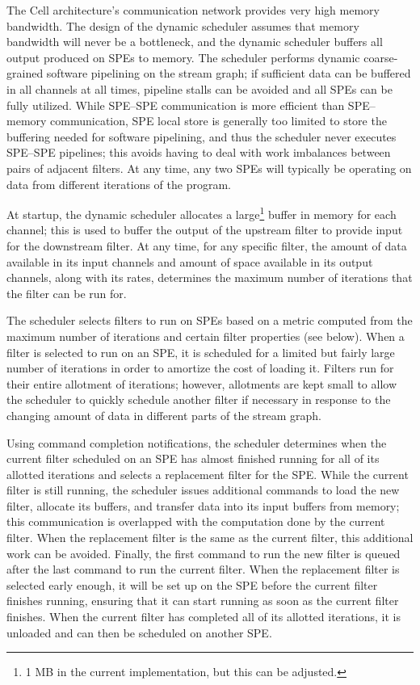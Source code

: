 The Cell architecture's communication network provides very high
memory bandwidth. The design of the dynamic scheduler assumes that
memory bandwidth will never be a bottleneck, and the dynamic scheduler
buffers all output produced on SPEs to memory. The scheduler performs
dynamic coarse-grained software pipelining on the stream graph; if
sufficient data can be buffered in all channels at all times, pipeline
stalls can be avoided and all SPEs can be fully utilized. While
SPE--SPE communication is more efficient than SPE--memory
communication, SPE local store is generally too limited to store the
buffering needed for software pipelining, and thus the scheduler never
executes SPE--SPE pipelines; this avoids having to deal with work
imbalances between pairs of adjacent filters. At any time, any two
SPEs will typically be operating on data from different 
iterations of the program.

At startup, the dynamic scheduler allocates a large\footnote{1 MB in
the current implementation, but this can be adjusted.} buffer in
memory for each channel; this is used to buffer the output of the
upstream filter to provide input for the downstream filter. At any
time, for any specific filter, the amount of data available in its
input channels and amount of space available in its output channels,
along with its rates, determines the maximum number of iterations that
the filter can be run for.

The scheduler selects filters to run on SPEs based on a metric
computed from the maximum number of iterations and certain filter
properties (see below). When a filter is selected to run on an SPE, it
is scheduled for a limited but fairly large number of iterations in
order to amortize the cost of loading it. Filters run for their entire
allotment of iterations; however, allotments are kept small to allow
the scheduler to quickly schedule another filter if necessary in
response to the changing amount of data in different parts of the stream graph.

Using command completion notifications,
the scheduler determines when the current filter scheduled on an SPE has
almost finished running for all of its allotted iterations and selects
a replacement filter for the SPE.
While the current filter is still running, the
scheduler issues additional commands to load the new filter, allocate
its buffers, and transfer data into its input buffers from memory;
this communication is overlapped with the computation done by the
current filter. When the replacement filter is the same as the current
filter, this additional work can be avoided. Finally, the first
command to run the new filter is queued after the last command to run
the current filter. When the replacement filter is selected early
enough, it will be set up on the SPE before the current filter
finishes running, ensuring that it can start running as soon as the
current filter finishes. When the current filter has completed all of
its allotted iterations, it is unloaded and can then be scheduled on
another SPE.

